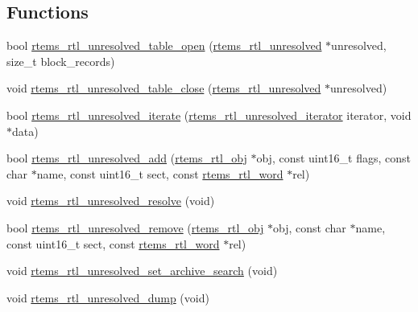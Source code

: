 \subsection*{Functions}
\begin{DoxyCompactItemize}
\item 
bool \mbox{\hyperlink{rtl-unresolved_8h_afe58fd2a20508d956028367eb0abc800}{rtems\+\_\+rtl\+\_\+unresolved\+\_\+table\+\_\+open}} (\mbox{\hyperlink{structrtems__rtl__unresolved}{rtems\+\_\+rtl\+\_\+unresolved}} $\ast$unresolved, size\+\_\+t block\+\_\+records)
\item 
void \mbox{\hyperlink{rtl-unresolved_8h_afc0bcd9592d51389c269ad21d424bc73}{rtems\+\_\+rtl\+\_\+unresolved\+\_\+table\+\_\+close}} (\mbox{\hyperlink{structrtems__rtl__unresolved}{rtems\+\_\+rtl\+\_\+unresolved}} $\ast$unresolved)
\item 
bool \mbox{\hyperlink{rtl-unresolved_8h_a22858b7a26c780b4206aaa9cf3a08ec6}{rtems\+\_\+rtl\+\_\+unresolved\+\_\+iterate}} (\mbox{\hyperlink{rtl-unresolved_8h_ab256ab6d71a66bca9ea2f63a86026c9d}{rtems\+\_\+rtl\+\_\+unresolved\+\_\+iterator}} iterator, void $\ast$data)
\item 
bool \mbox{\hyperlink{rtl-unresolved_8h_ac44b141fa52eac7924e104379259eddf}{rtems\+\_\+rtl\+\_\+unresolved\+\_\+add}} (\mbox{\hyperlink{structrtems__rtl__obj}{rtems\+\_\+rtl\+\_\+obj}} $\ast$obj, const uint16\+\_\+t flags, const char $\ast$name, const uint16\+\_\+t sect, const \mbox{\hyperlink{rtl-unresolved_8h_a5ab1ca8c94e49686f84f5ccf0731f0e6}{rtems\+\_\+rtl\+\_\+word}} $\ast$rel)
\item 
void \mbox{\hyperlink{rtl-unresolved_8h_a2db5b6d8608d201d44d1ee5db33afd25}{rtems\+\_\+rtl\+\_\+unresolved\+\_\+resolve}} (void)
\item 
bool \mbox{\hyperlink{rtl-unresolved_8h_adc53555aa32e9182fb9f29c3bd2a88dd}{rtems\+\_\+rtl\+\_\+unresolved\+\_\+remove}} (\mbox{\hyperlink{structrtems__rtl__obj}{rtems\+\_\+rtl\+\_\+obj}} $\ast$obj, const char $\ast$name, const uint16\+\_\+t sect, const \mbox{\hyperlink{rtl-unresolved_8h_a5ab1ca8c94e49686f84f5ccf0731f0e6}{rtems\+\_\+rtl\+\_\+word}} $\ast$rel)
\item 
void \mbox{\hyperlink{rtl-unresolved_8h_aa2b98ef7a1118212d31908c72730f486}{rtems\+\_\+rtl\+\_\+unresolved\+\_\+set\+\_\+archive\+\_\+search}} (void)
\item 
void \mbox{\hyperlink{rtl-unresolved_8h_a6777dd435b57c0294d2b34333beee40e}{rtems\+\_\+rtl\+\_\+unresolved\+\_\+dump}} (void)
\end{DoxyCompactItemize}


